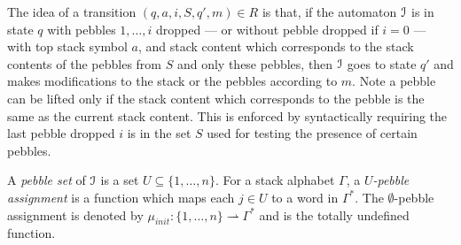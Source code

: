 \documentclass[a4paper,UKenglish,cleveref, autoref, thm-restate]{lipics-v2021}
\newcommand\mh[1]{\todo[inline,size=\scriptsize]{#1 - \textbf{Mathieu}}}
\begin{document}
The idea of a transition $(q, a, i, S, q', m) \in R$
is that, if the automaton $\mathcal{I}$ is in state $q$ with pebbles $1,\ldots, i$ dropped \---- or without pebble dropped if $i = 0$ \---- with top stack symbol $a$, and stack content which corresponds to the stack contents of the pebbles from $S$ and only these pebbles, then
$\mathcal{I}$ goes to state 
$q'$ and makes modifications to the stack or the pebbles according to
$m$. 
Note a pebble 
can be lifted only if the stack content which corresponds to the pebble
is the same as the current stack content. 
This is enforced by syntactically requiring
the last pebble dropped $i$ is in the set $S$ used for testing the presence of certain pebbles.

A {\em pebble set} of $\mathcal{I}$ is a set $U \subseteq \{ 1, \ldots, n\}$. For a stack alphabet $\Gamma$, a 
{\em $U \!$-pebble assignment} is a function which maps each $j \in U$ to a word in $ \Gamma^*$.
The $\emptyset$-pebble assignment is denoted by $\mu_{init} :  \{ 1, \ldots, n\} \rightharpoonup  \Gamma^* $ and is the 
totally undefined function.

\end{document}
